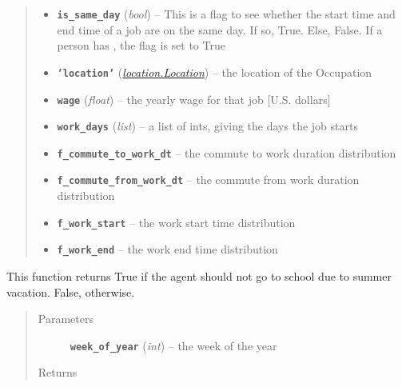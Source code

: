 \documentclass[letterpaper,10pt,english]{sphinxmanual}
\begin{document}
\begin{fulllineitems}
\begin{quote}
\begin{description}
\begin{itemize}
\item {} 
\textbf{\texttt{is\_same\_day}} (\emph{bool}) -- This is a flag to see whether the start time and end time of a job are                             on the same day. If so, True. Else, False. If a person has , the flag                             is set to True

\item {} 
\textbf{\texttt{'location'}} ({\hyperref[location:location.Location]{\emph{\emph{location.Location}}}}) -- the location of the Occupation

\item {} 
\textbf{\texttt{wage}} (\emph{float}) -- the yearly wage for that job {[}U.S. dollars{]}

\item {} 
\textbf{\texttt{work\_days}} (\emph{list}) -- a list of ints, giving the days the job starts

\item {} 
\textbf{\texttt{f\_commute\_to\_work\_dt}} -- the commute to work duration distribution

\item {} 
\textbf{\texttt{f\_commute\_from\_work\_dt}} -- the commute from work duration distribution

\item {} 
\textbf{\texttt{f\_work\_start}} -- the work start time distribution

\item {} 
\textbf{\texttt{f\_work\_end}} -- the work end time distribution

\end{itemize}

\end{description}\end{quote}

\begin{fulllineitems}
\label{occupation:occupation.Occupation.is_summer_vacation}
This function returns True if the agent should not go to school due to summer vacation. False, otherwise.
\begin{quote}\begin{description}
\item[{Parameters}] \leavevmode
\textbf{\texttt{week\_of\_year}} (\emph{int}) -- the week of the year

\item[{Returns}] \leavevmode



\end{description}
\end{quote}
\end{fulllineitems}
\end{fulllineitems}
\end{document}
